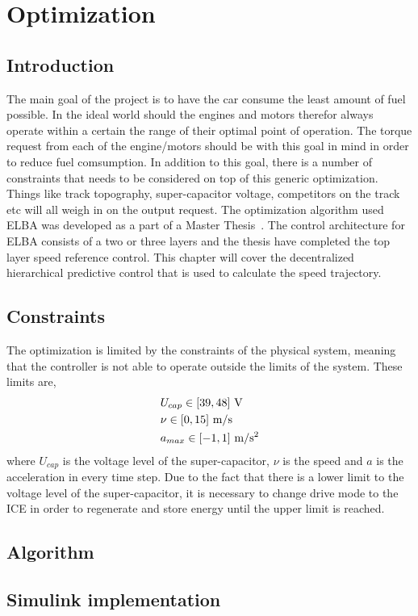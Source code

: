 \chapter{Optimization}
\section{Introduction}
The main goal of the project is to have the car consume the least amount of fuel
possible. In the ideal world should the engines and motors therefor always operate
within a certain the range of their optimal point of operation. The torque request
from each of the engine/motors should be with this goal in mind in order to reduce
fuel comsumption. In addition to this goal, there is a number of constraints that
needs to be considered on top of this generic optimization.  Things like track
topography, super-capacitor voltage, competitors on the track etc will all weigh in
on the output request. The optimization algorithm used ELBA was developed as a part
of a Master Thesis~\cite{lui2016}. The control architecture for ELBA consists of a
two or three layers and the thesis have completed the top layer speed reference
control. This chapter will cover the decentralized hierarchical predictive control
that is used to calculate the speed trajectory.

\section{Constraints}
The optimization is limited by the constraints of the physical system, meaning that
the controller is not able to operate outside the limits of the system. These limits
are,
\begin{align}
    &U_{cap} \in [39,48]~\textup{V} \\
    &\nu \in [0,15]~\textup{m/s}\\
    &a_{max} \in [-1,1]~\textup{m/s$^2$}
\end{align}
where $U_{cap}$ is the voltage level of the super-capacitor, $\nu$ is the speed and
$a$ is the acceleration in every time step. Due to the fact that there is a lower
limit to the voltage level of the super-capacitor, it is necessary to change
drive mode to the ICE in order to regenerate and store energy until the upper limit is
reached. 

\section{Algorithm}

\section{Simulink implementation}

